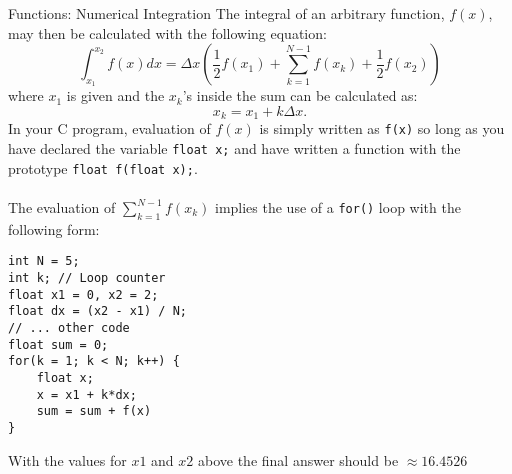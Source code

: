 \documentclass{lab}
\begin{document}
\begin{task}{Functions: Numerical Integration}{}
The integral of an arbitrary function, $f(x)$, may then be calculated with the following equation:
\begin{equation}
\int_{x_1}^{x_2} f(x) dx = \Delta x \left( \frac{1}{2} f(x_1) + \sum_{k=1}^{N-1} f(x_k) + \frac{1}{2} f(x_2) \right)
\end{equation}
where $x_1$ is given and the $x_k$'s inside the sum can be calculated as:
\begin{equation*}
x_k = x_1 + k \Delta x.
\end{equation*}
In your C program, evaluation of $f(x)$ is simply written as \texttt{f(x)} so long as you have declared the variable \texttt{float x;} and have written a function with the prototype \texttt{float f(float x);}.
\\~\\
The evaluation of $\sum_{k=1}^{N-1} f(x_k)$ implies the use of a \texttt{for()} loop with the following form:
\begin{lstlisting}[style=CStyle]
int N = 5;
int k; // Loop counter
float x1 = 0, x2 = 2;
float dx = (x2 - x1) / N;
// ... other code
float sum = 0;
for(k = 1; k < N; k++) {
	float x;
	x = x1 + k*dx;
	sum = sum + f(x)
}
\end{lstlisting}
With the values for $x1$ and $x2$ above the final answer should be $\approx 16.4526$
\end{task}
\end{document}
